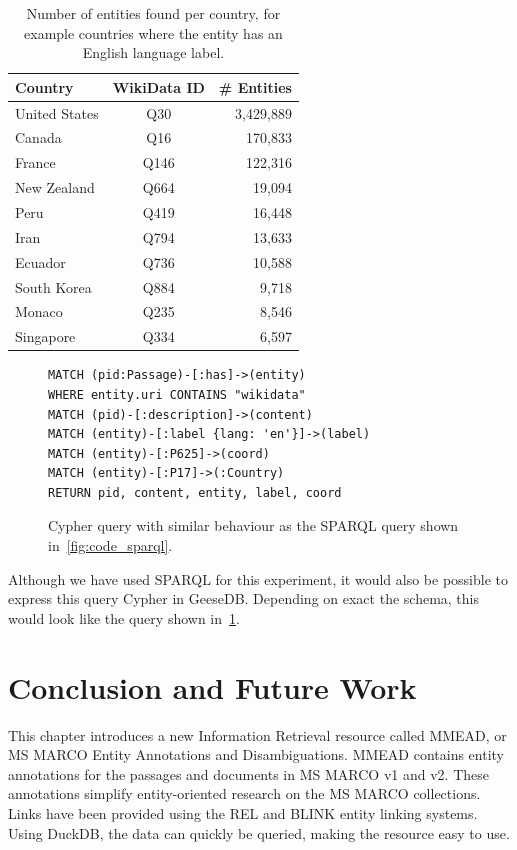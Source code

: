 \begin{table}[]
	\caption{Number of entities found per country, for example countries where the entity has an English language label.}
	\label{tab:country_entities}
	\centering
	\begin{tabular}{l|c|r}
		\toprule
		Country & WikiData ID & \# Entities\\
		\midrule
		United States & Q30 & 3,429,889 \\
		Canada & Q16 & 170,833 \\
		France & Q146 & 122,316 \\
		New Zealand & Q664 & 19,094\\
		Peru & Q419 & 16,448 \\
		Iran & Q794 & 13,633\\
		Ecuador & Q736 & 10,588 \\
		South Korea & Q884 & 9,718\\
		Monaco & Q235 & 8,546\\
		Singapore & Q334 & 6,597\\
		\bottomrule
	\end{tabular}
\end{table}

\begin{figure}
	\centering
	\begin{verbatim}
MATCH (pid:Passage)-[:has]->(entity)
WHERE entity.uri CONTAINS "wikidata"
MATCH (pid)-[:description]->(content)
MATCH (entity)-[:label {lang: 'en'}]->(label)
MATCH (entity)-[:P625]->(coord)
MATCH (entity)-[:P17]->(:Country)
RETURN pid, content, entity, label, coord
	\end{verbatim}
	\caption{Cypher query with similar behaviour as the SPARQL query shown in~\ref{fig:code_sparql}.}
	\label{fig:code_geese}
\end{figure}

Although we have used SPARQL for this experiment, it would also be possible to express this query Cypher in GeeseDB. Depending on exact the schema, this would look like the query shown in~\cref{fig:code_geese}.

\section{Conclusion and Future Work}
This chapter introduces a new Information Retrieval resource called MMEAD, or MS MARCO Entity Annotations and Disambiguations. MMEAD contains entity annotations for the passages and documents in MS MARCO v1 and v2. These annotations simplify entity-oriented research on the MS MARCO collections. Links have been provided using the REL and BLINK entity linking systems. Using DuckDB, the data can quickly be queried, making the resource easy to use.
 
